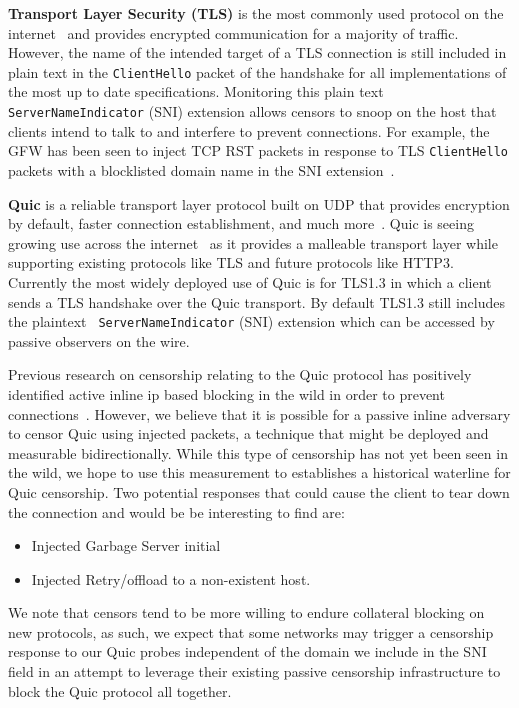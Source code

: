{\bf Transport Layer Security (TLS)} is the most commonly used
protocol on the internet~\cite{} and provides encrypted communication for a
majority of traffic. However, the name of the intended target of a TLS
connection is still included in plain text in the {\tt ClientHello} packet of
the handshake for all implementations of the most up to date specifications.
Monitoring this plain text {\tt ServerNameIndicator} (SNI) extension allows
censors to snoop on the host that clients intend to talk to and interfere to
prevent connections. For example, the GFW has been seen to inject TCP RST
packets in response to TLS {\tt ClientHello} packets with a blocklisted domain
name in the SNI extension~\cite{}.

{\bf Quic} is a reliable transport layer protocol built on UDP that provides
encryption by default, faster connection establishment, and much
more~\cite{RFC9000}. Quic is seeing growing use across the internet~\cite{} as
it provides a malleable transport layer while supporting existing protocols like
TLS and future protocols like HTTP3. Currently the most widely deployed use of
Quic is for TLS1.3 in which a client sends a TLS handshake over the Quic
transport. By default TLS1.3 still includes the plaintext {\tt
ServerNameIndicator} (SNI) extension which can be accessed by passive observers
on the wire.

Previous research on censorship relating to the Quic protocol has positively
identified active inline ip based blocking in the wild in order to prevent
connections~\cite{}. However, we believe that it is possible for a passive
inline adversary to censor Quic using injected packets, a technique that might be
deployed and measurable bidirectionally. While this type of censorship has not
yet been seen in the wild, we hope to use this measurement to establishes a
historical waterline for Quic censorship. Two potential responses that could
cause the client to tear down the connection and would be be interesting to find
are:
\begin{itemize}
	\item Injected Garbage Server initial
	\item Injected Retry/offload to a non-existent host.
\end{itemize}

We note that censors tend to be more willing to endure collateral blocking on
new protocols, as such, we expect that some networks may trigger a censorship
response to our Quic probes independent of the domain we include in the SNI
field in an attempt to leverage their existing passive censorship infrastructure
to block the Quic protocol all together.
\fi


